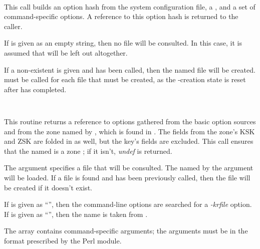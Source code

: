 \begin{description}

\item {}\verb" "

This  call builds an option hash from the system
configuration file, a , and a set of command-specific options.
A reference to this option hash is returned to the caller.

If  is given as an empty string, then no 
file will be consulted.  In this case, it is assumed that 
will be left out altogether.

If a non-existent  is given and 
has been called, then the named  file will be created.
 must be called for each  file that
must be created, as the  -creation state
is reset after  has completed.

\item {}\verb" "

This routine returns a reference to options gathered from the basic option
sources and from the zone  named by , which
is found in .  The  fields from the zone's
KSK and ZSK are folded in as well, but the key's  fields are
excluded.  This call ensures that the named  is a zone
; if it isn't, {\it undef} is returned.

The  argument specifies a  file that will
be consulted.  The  named by the  argument
will be loaded.  If a  file is found and
 has been previously called, then the 
file will be created if it doesn't exist.

If  is given as ``'', then the command-line options are
searched for a {\it -krfile} option.  If  is given as ``'',
then the name is taken from .

The \var{\@specopts} array contains command-specific arguments; the arguments
must be in the format prescribed by the  Perl module.

\item {}\verb" "


\end{description}
